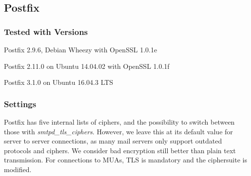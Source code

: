 

\subsection{Postfix}

\subsubsection{Tested with Versions}
\begin{itemize*}
  \item Postfix 2.9.6, Debian Wheezy with OpenSSL 1.0.1e
  \item Postfix 2.11.0 on Ubuntu 14.04.02 with OpenSSL 1.0.1f
  \item Postfix 3.1.0 on Ubuntu 16.04.3 LTS
\end{itemize*}


\subsubsection{Settings}

Postfix has five internal lists of ciphers, and the possibility to switch
between those with \emph{smtpd\_tls\_ciphers}. However, we leave this at its
default value for server to server connections, as many mail servers only
support outdated protocols and ciphers. We consider bad encryption still better
than plain text transmission. For connections to MUAs, TLS is mandatory and the
ciphersuite is modified.


